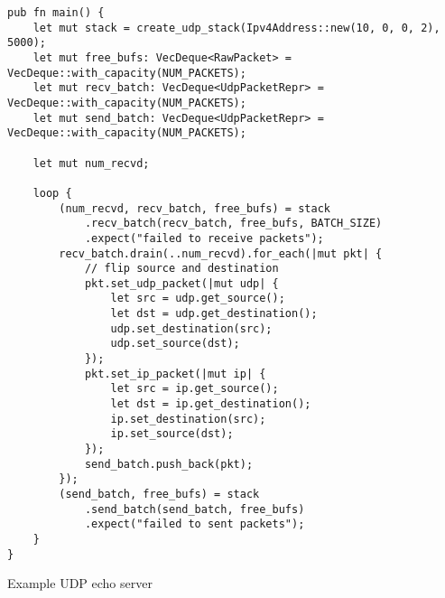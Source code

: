 \begin{listing}[!ht]
\begin{verbatim}
pub fn main() {
    let mut stack = create_udp_stack(Ipv4Address::new(10, 0, 0, 2), 5000);
    let mut free_bufs: VecDeque<RawPacket> = VecDeque::with_capacity(NUM_PACKETS);
    let mut recv_batch: VecDeque<UdpPacketRepr> = VecDeque::with_capacity(NUM_PACKETS);
    let mut send_batch: VecDeque<UdpPacketRepr> = VecDeque::with_capacity(NUM_PACKETS);

    let mut num_recvd;

    loop {
        (num_recvd, recv_batch, free_bufs) = stack
            .recv_batch(recv_batch, free_bufs, BATCH_SIZE)
            .expect("failed to receive packets");
        recv_batch.drain(..num_recvd).for_each(|mut pkt| {
            // flip source and destination
            pkt.set_udp_packet(|mut udp| {
                let src = udp.get_source();
                let dst = udp.get_destination();
                udp.set_destination(src);
                udp.set_source(dst);
            });
            pkt.set_ip_packet(|mut ip| {
                let src = ip.get_source();
                let dst = ip.get_destination();
                ip.set_destination(src);
                ip.set_source(dst);
            });
            send_batch.push_back(pkt);
        });
        (send_batch, free_bufs) = stack
            .send_batch(send_batch, free_bufs)
            .expect("failed to sent packets");
    }
}
\end{verbatim}
\caption{Example UDP echo server}
\label{listing:2}
\end{listing}
